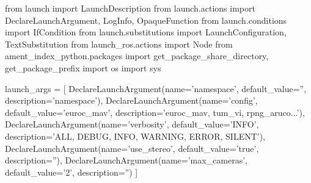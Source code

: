  
\begin{DoxyCode}
from launch \textcolor{keyword}{import} LaunchDescription
\textcolor{keyword}{from} launch.actions \textcolor{keyword}{import} DeclareLaunchArgument, LogInfo, OpaqueFunction
\textcolor{keyword}{from} launch.conditions \textcolor{keyword}{import} IfCondition
\textcolor{keyword}{from} launch.substitutions \textcolor{keyword}{import} LaunchConfiguration, TextSubstitution
\textcolor{keyword}{from} launch\_ros.actions \textcolor{keyword}{import} Node
\textcolor{keyword}{from} ament\_index\_python.packages \textcolor{keyword}{import} get\_package\_share\_directory, get\_package\_prefix
\textcolor{keyword}{import} os
\textcolor{keyword}{import} sys

launch\_args = [
    DeclareLaunchArgument(name=\textcolor{stringliteral}{'namespace'},         default\_value=\textcolor{stringliteral}{''},           description=\textcolor{stringliteral}{'namespace'}),
    DeclareLaunchArgument(name=\textcolor{stringliteral}{'config'},            default\_value=\textcolor{stringliteral}{'euroc\_mav'},  description=\textcolor{stringliteral}{'euroc\_mav,
       tum\_vi, rpng\_aruco...'}),
    DeclareLaunchArgument(name=\textcolor{stringliteral}{'verbosity'},         default\_value=\textcolor{stringliteral}{'INFO'},       description=\textcolor{stringliteral}{'ALL, DEBUG,
       INFO, WARNING, ERROR, SILENT'}),
    DeclareLaunchArgument(name=\textcolor{stringliteral}{'use\_stereo'},        default\_value=\textcolor{stringliteral}{'true'},       description=\textcolor{stringliteral}{''}),
    DeclareLaunchArgument(name=\textcolor{stringliteral}{'max\_cameras'},       default\_value=\textcolor{stringliteral}{'2'},          description=\textcolor{stringliteral}{''})
]


\end{DoxyCode}
